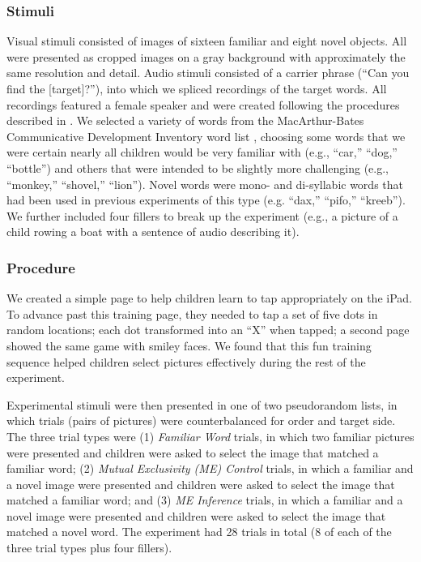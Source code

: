 \documentclass[man,noapacite]{apa2}
\begin{document}
\subsubsection{Stimuli}

Visual stimuli consisted of images of sixteen familiar and eight novel objects. All were presented as cropped images on a gray background with approximately the same resolution and detail.  Audio stimuli consisted of a carrier phrase (``Can you find the [target]?''), into which we spliced recordings of the target words. All recordings featured a female speaker and were created following the procedures described in . We selected a variety of words from the MacArthur-Bates Communicative Development Inventory word list \cite{fenson1994,fenson2007}, choosing some words that we were certain nearly all children would be very familiar with (e.g., ``car,'' ``dog,'' ``bottle'') and others that were intended to be slightly more challenging (e.g., ``monkey,'' ``shovel,'' ``lion''). Novel words were mono- and di-syllabic words that had been used in previous experiments of this type (e.g. ``dax,'' ``pifo,'' ``kreeb''). We further included four fillers to break up the experiment (e.g., a picture of a child rowing a boat with a sentence of audio describing it).

\subsubsection{Procedure}

We created a simple page to help children learn to tap appropriately on the iPad. To advance past this training page, they needed to tap a set of five dots in random locations; each dot transformed into an ``X'' when tapped; a second page showed the same game with smiley faces. We found that this fun training sequence helped children select pictures effectively during the rest of the experiment.

Experimental stimuli were then presented in one of two pseudorandom lists, in which trials (pairs of pictures) were counterbalanced for order and target side. The three trial types were (1) \emph{Familiar Word} trials, in which two familiar pictures were presented and children were asked to select the image that matched a familiar word; (2) \emph{Mutual Exclusivity (ME) Control} trials, in which a familiar and a novel image were presented and children were asked to select the image that matched a familiar word; and (3) \emph{ME Inference} trials, in which a familiar and a novel image were presented and children were asked to select the image that matched a novel word. The experiment had 28 trials in total (8 of each of the three trial types plus four fillers). 
\end{document}
